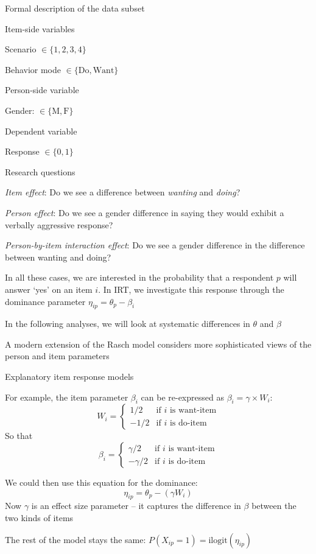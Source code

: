 \documentclass[aspectratio=169]{beamer}
\begin{document}
\begin{frame}[fragile]{Formal description of the data subset}

Item-side variables
\bi
\item Scenario $\in \{1,2,3,4\}$
\item Behavior mode $\in \{\text{Do},\text{Want}\}$
\ei

Person-side variable
\bi
\item Gender: $\in \{\text{M},\text{F}\}$
\ei

Dependent variable
\bi
\item Response $\in \{0,1\}$
\ei

\end{frame}



\begin{frame}[fragile]{Research questions}
\bi
\item \emph{Item effect}: Do we see a difference between \textit{wanting} and \textit{doing}?
\item \emph{Person effect}: Do we see a gender difference in saying they would exhibit a verbally aggressive response?
\item \emph{Person-by-item interaction effect}: Do we see a gender difference in the difference between wanting and doing?
\ei\pause

In all these cases, we are interested in the probability that a respondent $p$ will answer `yes' on an item $i$.  In IRT, we investigate this response through the dominance parameter $\eta_{ip} = \theta_p - \beta_i$\pause

In the following analyses, we will look at systematic differences in $\theta$ and $\beta$\pause

A modern extension of the Rasch model considers more sophisticated views of the person and item parameters \cite{deboeck2004explanatory}
\end{frame}


\begin{frame}[fragile]{Explanatory item response models}

For example, the item parameter $\beta_i$ can be re-expressed as $\beta_i = \gamma \times W_i $:
$$ W_i =
\begin{cases}
1/2  & \text{if $i$ is want-item}\\
-1/2 & \text{if $i$ is do-item}
\end{cases}$$\pause
So that
$$ \beta_i = 
\begin{cases}
\gamma/2  & \text{if $i$ is want-item}\\
-\gamma/2 & \text{if $i$ is do-item}
\end{cases}$$\pause

We could then use this equation for the dominance: 
$$\eta_{ip} = \theta_p - \left(\gamma W_i\right)$$\pause
Now $\gamma$ is an effect size parameter -- it captures the difference in $\beta$ between the two kinds of items\pause

The rest of the model stays the same:
$P(X_{ip}=1) = \text{ilogit}(\eta_{ip})$

\end{frame}
\end{document}
